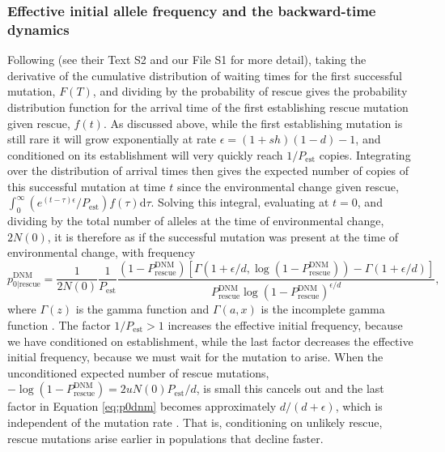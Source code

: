 \documentclass[]{article}
\begin{document}
\subsubsection*{Effective initial allele frequency and the backward-time dynamics}

Following \cite{orr2014population} (see their Text S2 and our File S1 for more detail), taking the derivative of the cumulative distribution of waiting times for the first successful mutation, $F(T)$, and dividing by the probability of rescue gives the probability distribution function for the arrival time of the first establishing rescue mutation given rescue, $f(t)$.
As discussed above, while the first establishing mutation is still rare it will grow exponentially at rate $\epsilon = (1+s h)(1-d) - 1$, and conditioned on its establishment will very quickly reach $1/P_\mathrm{est}$ copies. 
Integrating over the distribution of arrival times then gives the expected number of copies of this successful mutation at time $t$ since the environmental change given rescue, $\int_0^\infty (e^{(t-\tau) \epsilon} / P_\mathrm{est}) f(\tau) \mathrm{d}\tau$.
Solving this integral, evaluating at $t=0$, and dividing by the total number of alleles at the time of environmental change, $2N(0)$, it is therefore as if the successful mutation was present at the time of environmental change, with frequency
\begin{equation}\label{eq:p0dnm}
p_{0|\mathrm{rescue}}^{\mathrm{DNM}} = \frac{1}{2N(0)}\frac{1}{P_\mathrm{est}} \frac{(1-P_{\mathrm{rescue}}^{\mathrm{DNM}}) \left[\Gamma\left(1+\epsilon/d,\log(1-P_{\mathrm{rescue}}^{\mathrm{DNM}})\right) - \Gamma\left(1+\epsilon/d\right) \right]}{P_{\mathrm{rescue}}^{\mathrm{DNM}} \log(1-P_{\mathrm{rescue}}^{\mathrm{DNM}})^{\epsilon/d}},
\end{equation}
where $\Gamma(z)$ is the gamma function \citep[equation 6.1.1 in][]{abramowitz1972handbook} and $\Gamma(a,x)$ is the incomplete gamma function \citep[equation 6.5.3 in][]{abramowitz1972handbook}.
The factor $1/P_\mathrm{est}>1$ increases the effective initial frequency, because we have conditioned on establishment, while the last factor decreases the effective initial frequency, because we must wait for the mutation to arise.
When the unconditioned expected number of rescue mutations, $-\log(1-P_{\mathrm{rescue}}^{\mathrm{DNM}}) = 2 u N(0) P_\mathrm{est} / d$, is small this cancels out and the last factor in Equation \ref{eq:p0dnm} becomes approximately $d/(d+\epsilon)$, which is independent of the mutation rate \citep[as in the haploid case;][]{orr2014population}.
That is, conditioning on unlikely rescue, rescue mutations arise earlier in populations that decline faster.
\end{document}

